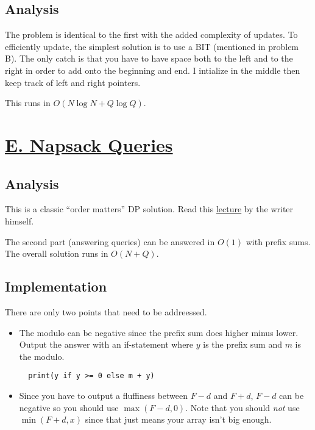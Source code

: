 \documentclass[11pt, oneside]{article}
\begin{document}
\subsection{Analysis}
The problem is identical to the first with the added complexity of updates. To efficiently update, the simplest solution is to use a BIT (mentioned in problem B). The only catch is that you have to have space both to the left and to the right in order to add onto the beginning and end. I intialize in the middle then keep track of left and right pointers.

This runs in \( O(N \log N + Q \log Q) \).

\newpage

\section{\href{https://codeforces.com/group/M4wsRWBHyZ/contest/259141/problem/E}{E. Napsack Queries}}

\subsection{Analysis}

This is a classic ``order matters'' DP solution. Read this \href{https://activities.tjhsst.edu/sct/lectures/1920/2019_10_25_Knapsack_DP.pdf}{lecture} by the writer himself.

The second part (answering queries) can be answered in \( O(1) \) with prefix sums. The overall solution runs in \( O(N + Q) \).

\subsection{Implementation}

There are only two points that need to be addreessed.
\begin{itemize}
  \item The modulo can be negative since the prefix sum does higher minus lower.
  Output the answer with an if-statement where \( y \) is the prefix sum and \( m \) is the modulo.
  \begin{verbatim}
  print(y if y >= 0 else m + y)
  \end{verbatim}
  \item Since you have to output a fluffiness between \( F - d \) and \( F + d \),
  \( F - d \) can be negative so you should use \( \max(F - d, 0) \). Note that you should \textit{not}
  use \( \min(F + d, x) \) since that just means your array isn't big enough.
\end{itemize}
\end{document}
